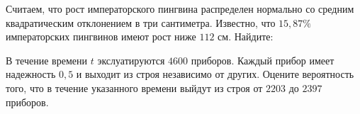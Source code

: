 \vfil

\begin{zkrPlain}{25}\noindent 
	Считаем, что рост императорского пингвина распределен нормально со средним квадратическим отклонением в три сантиметра. Известно, что $15{,}87\%$ императорских пингвинов имеют рост ниже $112$ см. Найдите: \par {}
 
\end{zkrPlain}

\vfil

\begin{zkrPlain}{25}\noindent 
	В течение времени $t$ экслуатируются $ 4600 $ приборов. Каждый прибор имеет надежность $ 0{,}5 $ и выходит из строя независимо от других. Оцените вероятность того, что в течение указанного времени выйдут из строя от $ 2203 $ до $ 2397 $ приборов.
 
\end{zkrPlain}

\newpage\setcounter{zad}{0}\setcounter{footnote}{0}

